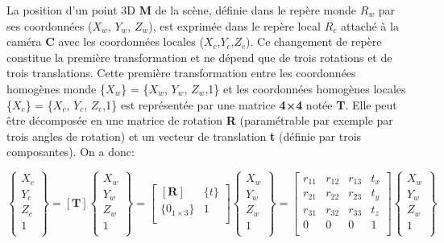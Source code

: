  
 La position d’un point 3D \textbf{M} de la scène, définie dans le repère monde $R_w$ par ses coordonnées ($X_w$, $Y_w$, $Z_w$), est exprimée dans le repère local $R_c$ attaché à la caméra \textbf{C} avec les coordonnées locales ($X_c$,$Y_c$,$Z_c$). Ce changement de repère constitue la première transformation et ne dépend que de trois rotations et de trois translations. Cette première transformation entre les coordonnées homogènes monde \{$X_w$\} = \{$X_w$, $Y_w$, $Z_w$,1\} et les coordonnées homogènes locales \{$X_c$\} = \{$X_c$, $Y_c$, $Z_c$,1\} est représentée par une matrice \textbf{4×4} notée \textbf{T}. Elle peut être décomposée en une matrice de rotation \textbf{R} (paramétrable par exemple par trois angles de rotation) et un vecteur de translation \textbf{t} (définie par trois composantes). On a donc:
 
 
 \begin{equation}
 \left\{
 \begin{array}{c}
 	X_c \\
 	Y_c\\
    Z_c \\
 	 1 \\
 \end{array}
 \right\}
 =
 \left[ \textbf{T} \right] 
 \left\{
 \begin{array}{c}
 	 X_w \\
 	 Y_w \\
 	 Z_w \\
 	 1 \\
 \end{array}
 \right\}
 =
 \left[  
 \begin{array}{cc}
\left[ \textbf{R} \right] & \{t\} \\
\{0_{1 \times 3}\} & 1 \\	 
 \end{array}
  \right] 
\left\{
\begin{array}{c}
	X_w \\
	Y_w \\
	Z_w \\
	1 \\
\end{array}
\right\}
=
 \left[ 
 \begin{array}{cccc}
 	r_{11} & r_{12} & r_{13} & t_x \\
 	r_{21} & r_{22} & r_{23} & t_y \\
 	r_{31} & r_{32} & r_{33} & t_z\\
 	0 & 0 & 0 & 1 \\
 \end{array}
  \right]
 \left\{
 \begin{array}{c}
 	X_w \\
 	Y_w \\
 	Z_w \\
 	1 \\
 \end{array}
 \right\}
  \end{equation}
 
